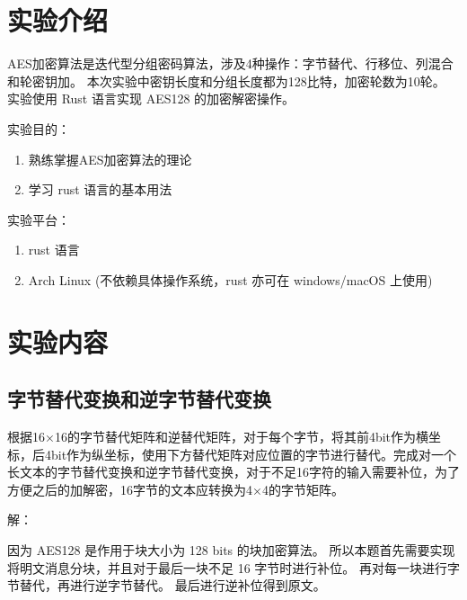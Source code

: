 \documentclass[degree=project,degree-type=project,cjk-font=noto]{thuthesis}
\begin{document}
\maketitle

\frontmatter
% 



\mainmatter

\chapter{实验介绍}
AES加密算法是迭代型分组密码算法，涉及4种操作：字节替代、行移位、列混合和轮密钥加。
本次实验中密钥长度和分组长度都为128比特，加密轮数为10轮。
实验使用 Rust 语言实现 AES128 的加密解密操作。

实验目的：

\begin{enumerate}
    \item 熟练掌握AES加密算法的理论
    \item 学习 rust 语言的基本用法
\end{enumerate}

实验平台：

\begin{enumerate}
    \item rust 语言
    \item Arch Linux (不依赖具体操作系统，rust 亦可在 windows/macOS 上使用)
\end{enumerate}

\chapter{实验内容}

\section{字节替代变换和逆字节替代变换}

    根据16×16的字节替代矩阵和逆替代矩阵，对于每个字节，将其前4bit作为横坐标，后4bit作为纵坐标，使用下方替代矩阵对应位置的字节进行替代。完成对一个长文本的字节替代变换和逆字节替代变换，对于不足16字符的输入需要补位，为了方便之后的加解密，16字节的文本应转换为4×4的字节矩阵。

{\heiti 解：}

因为 AES128 是作用于块大小为 128 bits 的块加密算法。
所以本题首先需要实现将明文消息分块，并且对于最后一块不足 16 字节时进行补位。
再对每一块进行字节替代，再进行逆字节替代。
最后进行逆补位得到原文。
\end{document}
